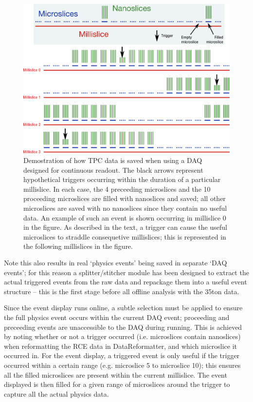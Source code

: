 \begin{figure}[ht]
  \centering
  \includegraphics[width=16cm]{triggered_event.png}
  \caption{Demostration of how TPC data is saved when using a DAQ designed for continuous readout.  The black arrows represent hypothetical triggers occurring within the duration of a particular millislice.  In each case, the 4 preceeding microslices and the 10 proceeding microslices are filled with nanoslices and saved; all other microslices are saved with no nanoslices since they contain no useful data.  An example of such an event is shown occurring in millislice 0 in the figure.  As described in the text, a trigger can cause the useful microslices to straddle consequetive millislices; this is represented in the following millislices in the figure.}
  \label{fig:TriggeredEvent}
\end{figure}
Note this also results in real `physics events' being saved in separate `DAQ events'; for this reason a splitter/stitcher module has been designed to extract the actual triggered events from the raw data and repackage them into a useful event structure -- this is the first stage before all offline analysis with the 35ton data.

Since the event display runs online, a subtle selection must be applied to ensure the full physics event occurs within the current DAQ event; proceeding and preceeding events are unaccessible to the DAQ during running.  This is achieved by noting whether or not a trigger occurred (i.e. microslices contain nanoslices) when reformatting the RCE data in DataReformatter, and which microslice it occurred in.  For the event display, a triggered event is only useful if the trigger occurred within a certain range (e.g. microslice 5 to microslice 10); this ensures all the filled microslices are present within the current millislice.  The event displayed is then filled for a given range of microslices around the trigger to capture all the actual physics data.

